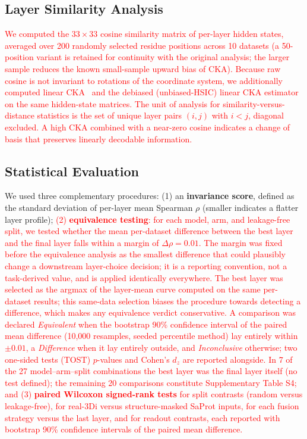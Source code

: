 \documentclass[numbered,webpdf,modern,large]{oup-authoring-template}
\newcommand{\rev}[1]{\textcolor{red}{#1}}
\begin{document}
\subsection{Layer Similarity Analysis}

\rev{We computed the $33 \times 33$ cosine similarity matrix of per-layer hidden
states, averaged over 200 randomly selected residue positions across 10 datasets
(a 50-position variant is retained for continuity with the original analysis;
the larger sample reduces the known small-sample upward bias of CKA). Because
raw cosine is not invariant to rotations of the coordinate system, we
additionally computed linear CKA~\cite{kornblith2019similarity} and the
debiased (unbiased-HSIC) linear CKA
estimator~\cite{szekely2021debiased} on the same hidden-state matrices. The unit
of analysis for similarity-versus-distance statistics is the set of unique layer
pairs $(i, j)$ with $i < j$, diagonal excluded. A high CKA combined with a
near-zero cosine indicates a change of basis that preserves linearly decodable
information.}

\subsection{Statistical Evaluation}

We used three complementary procedures: (1) an \textbf{invariance score}, defined
as the standard deviation of per-layer mean Spearman $\rho$ (smaller indicates a
flatter layer profile);
\rev{(2) \textbf{equivalence testing}: for each model, arm, and leakage-free
split, we tested whether the mean per-dataset difference between the best layer
and the final layer falls within a margin of $\Delta\rho = 0.01$. The margin was
fixed before the equivalence analysis as the smallest difference that could
plausibly change a downstream layer-choice decision; it is a reporting
convention, not a task-derived value, and is applied identically everywhere.
The best layer was selected as the argmax of the layer-mean curve computed on
the same per-dataset results; this same-data selection biases the procedure
towards detecting a difference, which makes any equivalence verdict
conservative. A comparison was declared \emph{Equivalent} when the bootstrap
90\% confidence interval of the paired mean difference (10{,}000 resamples,
seeded percentile method) lay entirely within $\pm 0.01$, a \emph{Difference}
when it lay entirely outside, and \emph{Inconclusive} otherwise; two one-sided
tests (TOST) $p$-values and Cohen's $d_z$ are reported alongside. In 7 of the
27 model--arm--split combinations the best layer was the final layer itself
(no test defined); the remaining 20 comparisons constitute Supplementary Table
S4; and (3) \textbf{paired Wilcoxon signed-rank tests} for split contrasts
(random versus leakage-free), for real-3Di versus structure-masked SaProt
inputs, for each fusion strategy versus the last layer, and for readout
contrasts, each reported with bootstrap 90\% confidence intervals of the paired
mean difference.}
\end{document}

